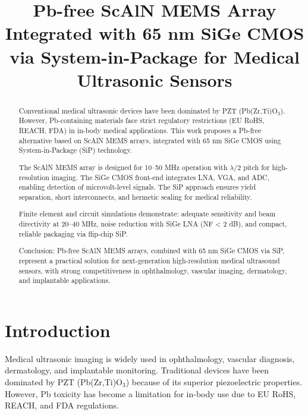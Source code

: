 \documentclass[conference]{IEEEtran}
\begin{document}
\title{Pb-free ScAlN MEMS Array Integrated with 65 nm SiGe CMOS via System-in-Package for Medical Ultrasonic Sensors}

\author{
}

\maketitle

\begin{abstract}
Conventional medical ultrasonic devices have been dominated by PZT (Pb(Zr,Ti)O$_3$). 
However, Pb-containing materials face strict regulatory restrictions (EU RoHS, REACH, FDA) in in-body medical applications. 
This work proposes a Pb-free alternative based on ScAlN MEMS arrays, integrated with 65 nm SiGe CMOS using System-in-Package (SiP) technology.

The ScAlN MEMS array is designed for 10--50 MHz operation with $\lambda/2$ pitch for high-resolution imaging. 
The SiGe CMOS front-end integrates LNA, VGA, and ADC, enabling detection of microvolt-level signals. 
The SiP approach ensures yield separation, short interconnects, and hermetic sealing for medical reliability.

Finite element and circuit simulations demonstrate:
adequate sensitivity and beam directivity at 20--40 MHz,
noise reduction with SiGe LNA (NF < 2 dB),
and compact, reliable packaging via flip-chip SiP.

Conclusion: Pb-free ScAlN MEMS arrays, combined with 65 nm SiGe CMOS via SiP, represent a practical solution for next-generation high-resolution medical ultrasound sensors, with strong competitiveness in ophthalmology, vascular imaging, dermatology, and implantable applications.
\end{abstract}

\section{Introduction}
Medical ultrasonic imaging is widely used in ophthalmology, vascular diagnosis, dermatology, and implantable monitoring. 
Traditional devices have been dominated by PZT (Pb(Zr,Ti)O$_3$) because of its superior piezoelectric properties. 
However, Pb toxicity has become a limitation for in-body use due to EU RoHS, REACH, and FDA regulations.
\end{document}
